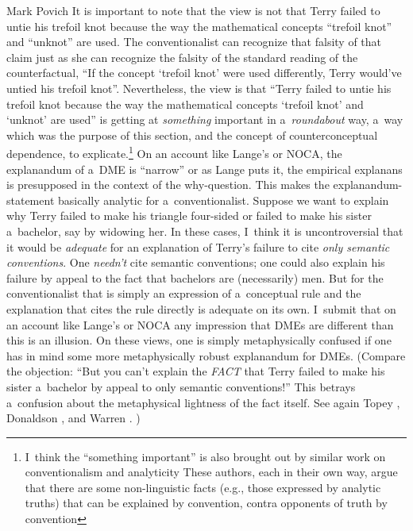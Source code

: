 \begin{artengenv}{Mark Povich}
It is important to note that the view is not that Terry failed to untie his trefoil knot because the way the mathematical concepts ``trefoil knot'' and ``unknot'' are used. The conventionalist can recognize that falsity of that claim just as she can recognize the falsity of the standard reading of the counterfactual, ``If the concept ‘trefoil knot' were used differently, Terry would've untied his trefoil knot''. Nevertheless, the view is that ``Terry failed to untie his trefoil knot because the way the mathematical concepts ‘trefoil knot' and ‘unknot' are used'' is getting at \textit{something} important in a~\textit{roundabout} way, a~way which was the purpose of this section, and the concept of counterconceptual dependence, to explicate.\footnote{I~think the ``something important'' is also brought out by similar work on conventionalism and analyticity
 These authors, each in their own way, argue that there are some non-linguistic facts (e.g., those expressed by analytic truths) that can be explained by convention, contra opponents of truth by convention 
} On an account like Lange's or NOCA, the explanandum of a~DME is ``narrow'' or as Lange puts it, the empirical explanans is presupposed in the context of the why-question. This makes the explanandum-statement basically analytic for a~conventionalist. Suppose we want to explain why Terry failed to make his triangle four-sided or failed to make his sister a~bachelor, say by widowing her. In these cases, I~think it is uncontroversial that it would be \textit{adequate} for an explanation of Terry's failure to cite \textit{only semantic conventions}.
\parencite[][]{craver_constitutive_2021} %
 One \textit{needn't} cite semantic conventions; one could also explain his failure by appeal to the fact that bachelors are (necessarily) men. But for the conventionalist that is simply an expression of a~conceptual rule and the explanation that cites the rule directly is adequate on its own. I~submit that on an account like Lange's or NOCA any impression that DMEs are different than this is an illusion. On these views, one is simply metaphysically confused if one has in mind some more metaphysically robust explanandum for DMEs. (Compare the objection: ``But you can't explain the \textit{FACT} that Terry failed to make his sister a~bachelor by appeal to only semantic conventions!'' This betrays a~confusion about the metaphysical lightness of the fact itself. See again Topey 
\parencite*[][]{topey_linguistic_2019}, %
 Donaldson 
\parencite*[][]{raven_analyticity_2021}, %
 and Warren 
\parencite*[][]{warren_shadows_2020}.%
)


\end{artengenv}
